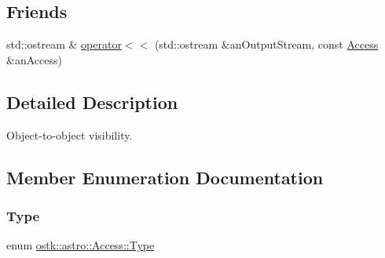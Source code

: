 \subsection*{Friends}
\begin{DoxyCompactItemize}
\item 
std\+::ostream \& \hyperlink{classostk_1_1astro_1_1_access_a84eabd1ef8d3eeff0b6a80851727a2b4}{operator$<$$<$} (std\+::ostream \&an\+Output\+Stream, const \hyperlink{classostk_1_1astro_1_1_access}{Access} \&an\+Access)
\end{DoxyCompactItemize}


\subsection{Detailed Description}
Object-\/to-\/object visibility. 

\subsection{Member Enumeration Documentation}
\mbox{\label{classostk_1_1astro_1_1_access_aac00b1a6ead7db92eba5b71e43235c93}} 
\subsubsection{\texorpdfstring{Type}{Type}}
{\footnotesize\ttfamily enum \hyperlink{classostk_1_1astro_1_1_access_aac00b1a6ead7db92eba5b71e43235c93}{ostk\+::astro\+::\+Access\+::\+Type}\hspace{0.3cm}{\ttfamily [strong]}}

